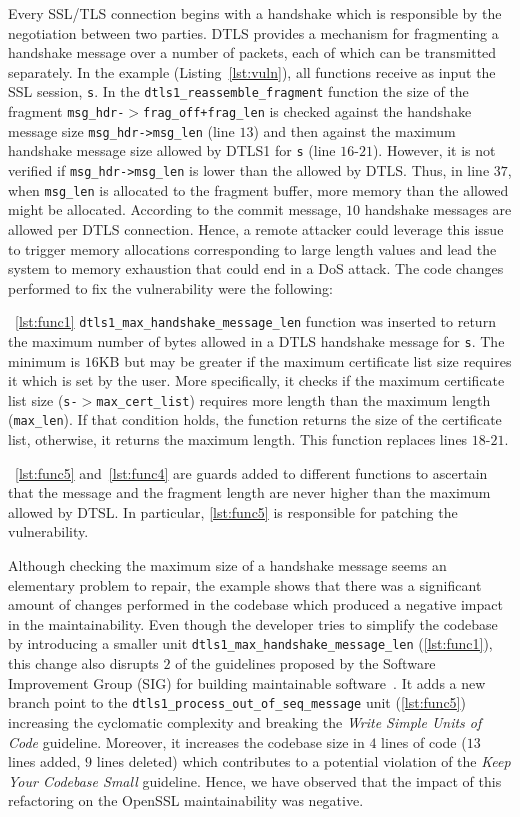 \documentclass[10pt,conference]{IEEEtran}
\begin{document}
Every SSL/TLS connection begins with a handshake which is responsible by the
negotiation between two parties. DTLS provides a mechanism for fragmenting a
handshake message over a number of packets, each of which can be transmitted
separately. In the example (Listing~\ref{lst:vuln}), all functions receive as
input the SSL session, \texttt{s}. In the \texttt{dtls1\_reassemble\_fragment}
function the size of the fragment \texttt{msg\_hdr-$>$frag\_off+frag\_len} is
checked against the handshake message size \texttt{msg\_hdr->msg\_len} (line
$13$) and then against the maximum handshake message size allowed by DTLS1 for
\texttt{s} (line $16$-$21$). However, it is not verified if
\texttt{msg\_hdr->msg\_len} is lower than the allowed by DTLS. Thus, in line
$37$, when \texttt{msg\_len} is allocated to the fragment buffer, more memory
than the allowed might be allocated. According to the commit message, $10$
handshake messages are allowed per DTLS connection. Hence, a remote attacker
could leverage this issue to trigger memory allocations corresponding to large
length values and lead the system to memory exhaustion that could end in a DoS
attack. The code changes performed to fix the vulnerability were the following:

~\ref{lst:func1} \texttt{dtls1\_max\_handshake\_message\_len} function was
inserted to return the maximum number of bytes allowed in a DTLS
handshake message for \texttt{s}. The minimum is $16$KB but may be greater if
the maximum certificate list size requires it which is set by the user. More
specifically, it checks if the maximum certificate list size
(\texttt{s-$>$max\_cert\_list}) requires more length than the maximum length
(\texttt{max\_len}). If that condition holds, the function returns the size of
the certificate list, otherwise, it returns the maximum length. This function
replaces lines $18$-$21$.

~\ref{lst:func5} and~\ref{lst:func4} are guards added to different functions to
ascertain that the message and the fragment length are never higher than the
maximum allowed by DTSL. In particular, \ref{lst:func5} is responsible for patching
the vulnerability.

Although checking the maximum size of a handshake message seems an elementary
problem to repair, the example shows that there was a significant amount of
changes performed in the codebase which produced a negative impact in the
maintainability. Even though the developer tries to simplify the
codebase by introducing a smaller unit
\texttt{dtls1\_max\_handshake\_message\_len} (\ref{lst:func1}), this change also
disrupts $2$ of the guidelines proposed by the Software Improvement Group (SIG) for
building maintainable software~\cite{Visser:2016:OREILLY}. It adds a new branch
point to the \texttt{dtls1\_process\_out\_of\_seq\_message} unit
(\ref{lst:func5}) increasing the cyclomatic complexity and breaking the
\emph{Write Simple Units of Code} guideline. Moreover, it increases the codebase
size in $4$ lines of code ($13$ lines added, $9$ lines deleted) which
contributes to a potential violation of the \emph{Keep Your Codebase Small}
guideline. Hence, we have observed that the impact of this refactoring on the
OpenSSL maintainability was negative.
\end{document}
